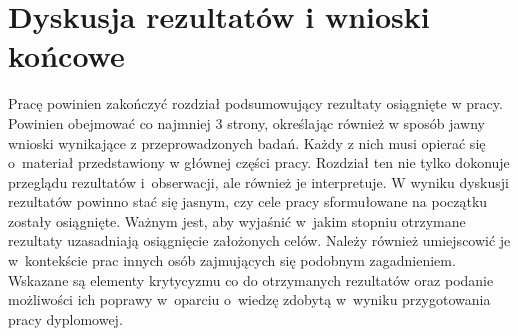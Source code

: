 \chapter{Dyskusja rezultatów i wnioski końcowe}
Pracę powinien zakończyć rozdział podsumowujący rezultaty osiągnięte w pracy. Powinien obejmować co najmniej 3 strony, określając również w sposób jawny wnioski wynikające z przeprowadzonych badań. Każdy z nich musi opierać się o~materiał przedstawiony w głównej części pracy. Rozdział ten nie tylko dokonuje przeglądu rezultatów i~obserwacji, ale również je interpretuje. W wyniku dyskusji rezultatów powinno stać się jasnym, czy cele pracy sformułowane na początku zostały osiągnięte. Ważnym jest, aby wyjaśnić w~jakim stopniu otrzymane rezultaty uzasadniają osiągnięcie założonych celów. Należy również umiejscowić je w~kontekście prac innych osób zajmujących się podobnym zagadnieniem. Wskazane są elementy krytycyzmu co do otrzymanych rezultatów oraz podanie możliwości ich poprawy w~oparciu o~wiedzę zdobytą w~wyniku przygotowania pracy dyplomowej.
